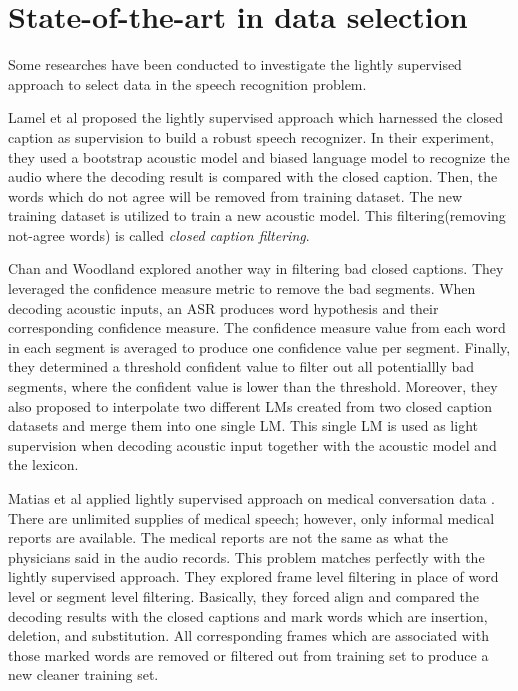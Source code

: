 \section{State-of-the-art in data selection}
\label{stateoftheart}
Some researches have been conducted to investigate the lightly supervised approach to select data in the speech recognition problem\cite{lightlySupervised,Lecouteux06imperfecttranscript,Chan,Mathias,Stolcke00anefficient}. 


Lamel et al proposed the lightly supervised approach which harnessed the closed caption as supervision to build a robust speech recognizer\cite{lightlySupervised}. In their experiment, they used a bootstrap acoustic model and biased language model to recognize the audio where the decoding result is compared with the closed caption. Then, the words which do not agree will be removed from training dataset. The new training dataset is utilized to train a  new acoustic model. This filtering(removing not-agree words) is called \textit{closed caption filtering}.

Chan and Woodland explored another way in filtering bad closed captions\cite{Chan}. They leveraged the confidence measure metric to remove the bad segments. When decoding acoustic inputs, an ASR produces word hypothesis and their corresponding confidence measure. The confidence measure value from each word in  each segment is averaged to produce one confidence value per segment. Finally, they determined a threshold confident value to filter out all potentiallly bad segments, where the confident value is lower than the threshold. Moreover, they also proposed to interpolate two different LMs created from two closed caption datasets and merge them into one single LM. This single LM is used as light supervision when decoding acoustic input together with the acoustic model and the lexicon.

Matias et al applied lightly supervised approach on medical conversation data \cite{Mathias}. There are unlimited supplies of medical speech; however, only informal medical reports are available. The medical reports are not the same as what the physicians said in the audio records. This problem matches perfectly with the lightly supervised approach. They explored frame level filtering in place of word level or segment level filtering. Basically, they forced align and compared the decoding results with the closed captions and mark words which are insertion, deletion, and substitution. All corresponding frames which are associated with those marked words are removed or filtered out from training set to produce a new cleaner training set.

